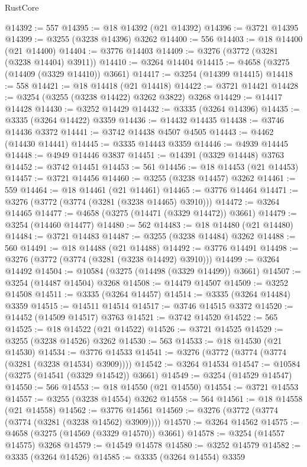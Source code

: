 \begin{lexlean}{RustCore}
\begin{coremodule}
@14392 := 557
@14395 := @18 @14392 (@21 @14392)
@14396 := @3721 @14395
@14399 := @3255 (@3238 @14396) @3262
@14400 := 556
@14403 := @18 @14400 (@21 @14400)
@14404 := @3776 @14403
@14409 := @3276 (@3772 (@3281 (@3238 @14404) @3911))
@14410 := @3264 @14404
@14415 := @4658 (@3275 (@14409 (@3329 @14410)) @3661)
@14417 := @3254 (@14399 @14415)
@14418 := 558
@14421 := @18 @14418 (@21 @14418)
@14422 := @3721 @14421
@14428 := @3254 (@3255 (@3238 @14422) @3262 @3822) @3268
@14429 := @14417 @14428
@14430 := @3252 @14429
@14432 := @3335 (@3264 @14396)
@14435 := @3335 (@3264 @14422) @3359
@14436 := @14432 @14435
@14438 := @3746 @14436 @3372
@14441 := @3742 @14438 @4507 @4505
@14443 := @4462 (@14430 @14441)
@14445 := @3335 @14443 @3359
@14446 := @4939 @14445
@14448 := @4949 @14446 @3837
@14451 := @14391 (@3329 @14448) @3763
@14452 := @3742 @14451
@14453 := 561
@14456 := @18 @14453 (@21 @14453)
@14457 := @3721 @14456
@14460 := @3255 (@3238 @14457) @3262
@14461 := 559
@14464 := @18 @14461 (@21 @14461)
@14465 := @3776 @14464
@14471 := @3276 (@3772 (@3774 (@3281 (@3238 @14465) @3910)))
@14472 := @3264 @14465
@14477 := @4658 (@3275 (@14471 (@3329 @14472)) @3661)
@14479 := @3254 (@14460 @14477)
@14480 := 562
@14483 := @18 @14480 (@21 @14480)
@14484 := @3721 @14483
@14487 := @3255 (@3238 @14484) @3262
@14488 := 560
@14491 := @18 @14488 (@21 @14488)
@14492 := @3776 @14491
@14498 := @3276 (@3772 (@3774 (@3281 (@3238 @14492) @3910)))
@14499 := @3264 @14492
@14504 := @10584 (@3275 (@14498 (@3329 @14499)) @3661)
@14507 := @3254 (@14487 @14504) @3268
@14508 := @14479 @14507
@14509 := @3252 @14508
@14511 := @3335 (@3264 @14457)
@14514 := @3335 (@3264 @14484) @3359
@14515 := @14511 @14514
@14517 := @3746 @14515 @3372
@14520 := @14452 (@14509 @14517) @3763
@14521 := @3742 @14520
@14522 := 565
@14525 := @18 @14522 (@21 @14522)
@14526 := @3721 @14525
@14529 := @3255 (@3238 @14526) @3262
@14530 := 563
@14533 := @18 @14530 (@21 @14530)
@14534 := @3776 @14533
@14541 := @3276 (@3772 (@3774 (@3774 (@3281 (@3238 @14534) @3909))))
@14542 := @3264 @14534
@14547 := @10584 (@3275 (@14541 (@3329 @14542)) @3661)
@14549 := @3254 (@14529 @14547)
@14550 := 566
@14553 := @18 @14550 (@21 @14550)
@14554 := @3721 @14553
@14557 := @3255 (@3238 @14554) @3262
@14558 := 564
@14561 := @18 @14558 (@21 @14558)
@14562 := @3776 @14561
@14569 := @3276 (@3772 (@3774 (@3774 (@3281 (@3238 @14562) @3909))))
@14570 := @3264 @14562
@14575 := @4658 (@3275 (@14569 (@3329 @14570)) @3661)
@14578 := @3254 (@14557 @14575) @3268
@14579 := @14549 @14578
@14580 := @3252 @14579
@14582 := @3335 (@3264 @14526)
@14585 := @3335 (@3264 @14554) @3359

\end{coremodule}
\end{lexlean}
